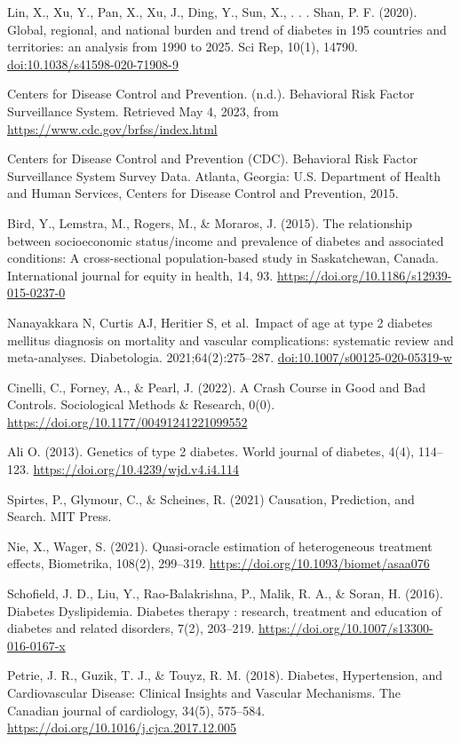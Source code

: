\documentclass[
  12pt,
]{article}
\begin{document}
Lin, X., Xu, Y., Pan, X., Xu, J., Ding, Y., Sun, X., . . . Shan, P. F.
(2020). Global, regional, and national burden and trend of diabetes in
195 countries and territories: an analysis from 1990 to 2025. Sci Rep,
10(1), 14790. \url{doi:10.1038/s41598-020-71908-9}

Centers for Disease Control and Prevention. (n.d.). Behavioral Risk
Factor Surveillance System. Retrieved May 4, 2023, from
\url{https://www.cdc.gov/brfss/index.html}

Centers for Disease Control and Prevention (CDC). Behavioral Risk Factor
Surveillance System Survey Data. Atlanta, Georgia: U.S. Department of
Health and Human Services, Centers for Disease Control and Prevention,
2015.

Bird, Y., Lemstra, M., Rogers, M., \& Moraros, J. (2015). The
relationship between socioeconomic status/income and prevalence of
diabetes and associated conditions: A cross-sectional population-based
study in Saskatchewan, Canada. International journal for equity in
health, 14, 93. \url{https://doi.org/10.1186/s12939-015-0237-0}

Nanayakkara N, Curtis AJ, Heritier S, et al.~Impact of age at type 2
diabetes mellitus diagnosis on mortality and vascular complications:
systematic review and meta-analyses. Diabetologia. 2021;64(2):275--287.
\url{doi:10.1007/s00125-020-05319-w}

Cinelli, C., Forney, A., \& Pearl, J. (2022). A Crash Course in Good and
Bad Controls. Sociological Methods \& Research, 0(0).
\url{https://doi.org/10.1177/00491241221099552}

Ali O. (2013). Genetics of type 2 diabetes. World journal of diabetes,
4(4), 114--123. \url{https://doi.org/10.4239/wjd.v4.i4.114}

Spirtes, P., Glymour, C., \& Scheines, R. (2021) Causation, Prediction,
and Search. MIT Press.

Nie, X., Wager, S. (2021). Quasi-oracle estimation of heterogeneous
treatment effects, Biometrika, 108(2), 299--319.
\url{https://doi.org/10.1093/biomet/asaa076}

Schofield, J. D., Liu, Y., Rao-Balakrishna, P., Malik, R. A., \& Soran,
H. (2016). Diabetes Dyslipidemia. Diabetes therapy : research, treatment
and education of diabetes and related disorders, 7(2), 203--219.
\url{https://doi.org/10.1007/s13300-016-0167-x}

Petrie, J. R., Guzik, T. J., \& Touyz, R. M. (2018). Diabetes,
Hypertension, and Cardiovascular Disease: Clinical Insights and Vascular
Mechanisms. The Canadian journal of cardiology, 34(5), 575--584.
\url{https://doi.org/10.1016/j.cjca.2017.12.005}
\end{document}
